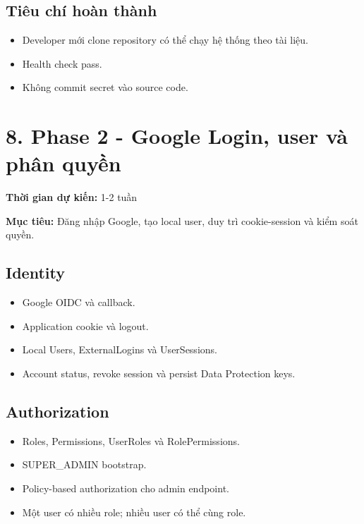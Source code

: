 \documentclass[
  11pt,
  a4paper,
]{article}
\begin{document}
\subsection{Tiêu chí hoàn
thành}\label{tiuxeau-chuxed-houxe0n-thuxe0nh-1}

\begin{itemize}
\item
  Developer mới clone repository có thể chạy hệ thống theo tài liệu.
\item
  Health check pass.
\item
  Không commit secret vào source code.
\end{itemize}

\section{8. Phase 2 - Google Login, user và phân
quyền}\label{phase-2---google-login-user-vuxe0-phuxe2n-quyux1ec1n}

\textbf{Thời gian dự kiến:} 1-2 tuần

\textbf{Mục tiêu:} Đăng nhập Google, tạo local user, duy trì
cookie-session và kiểm soát quyền.

\subsection{Identity}\label{identity}

\begin{itemize}
\item
  Google OIDC và callback.
\item
  Application cookie và logout.
\item
  Local Users, ExternalLogins và UserSessions.
\item
  Account status, revoke session và persist Data Protection keys.
\end{itemize}

\subsection{Authorization}\label{authorization}

\begin{itemize}
\item
  Roles, Permissions, UserRoles và RolePermissions.
\item
  SUPER\_ADMIN bootstrap.
\item
  Policy-based authorization cho admin endpoint.
\item
  Một user có nhiều role; nhiều user có thể cùng role.
\end{itemize}
\end{document}
